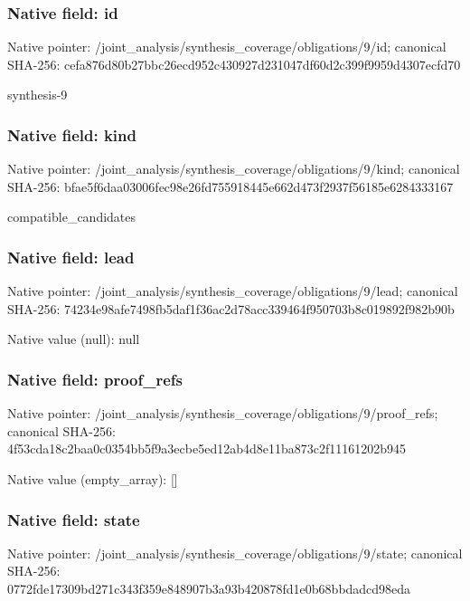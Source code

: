 \documentclass[10pt,a4paper]{article}
\begin{document}
\subsubsection{Native field: id}
Native pointer: /joint\_\allowbreak{}analysis/synthesis\_\allowbreak{}coverage/obligations/9/id; canonical SHA-256: cefa876d80b27bbc26ecd952c430927d231047df60d2c399f9959d4307ecfd70

\begingroup\raggedright\sloppy synthesis-9\par\endgroup

\subsubsection{Native field: kind}
Native pointer: /joint\_\allowbreak{}analysis/synthesis\_\allowbreak{}coverage/obligations/9/kind; canonical SHA-256: bfae5f6daa03006fec98e26fd755918445e662d473f2937f56185e6284333167

\begingroup\raggedright\sloppy compatible\_\allowbreak{}candidates\par\endgroup

\subsubsection{Native field: lead}
Native pointer: /joint\_\allowbreak{}analysis/synthesis\_\allowbreak{}coverage/obligations/9/lead; canonical SHA-256: 74234e98afe7498fb5daf1f36ac2d78acc339464f950703b8c019892f982b90b

Native value (null): null

\subsubsection{Native field: proof\_\allowbreak{}refs}
Native pointer: /joint\_\allowbreak{}analysis/synthesis\_\allowbreak{}coverage/obligations/9/proof\_\allowbreak{}refs; canonical SHA-256: 4f53cda18c2baa0c0354bb5f9a3ecbe5ed12ab4d8e11ba873c2f11161202b945

Native value (empty\_\allowbreak{}array): []

\subsubsection{Native field: state}
Native pointer: /joint\_\allowbreak{}analysis/synthesis\_\allowbreak{}coverage/obligations/9/state; canonical SHA-256: 0772fde17309bd271c343f359e848907b3a93b420878fd1e0b68bbdadcd98eda
\end{document}
